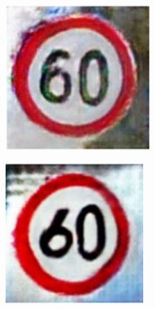 \begin{figure}[H]
\begin{subfigure}{0.125\textwidth}
    \end{subfigure}
    \hspace{2em}%
    \begin{subfigure}{0.125\textwidth}
        \centering
        \includegraphics[height=\textwidth]{../images/Taiwan Schilder/Generated6.png}
    \end{subfigure}
    \hspace{2em}%
    \begin{subfigure}{0.125\textwidth}
        \centering
        \includegraphics[height=\textwidth]{../images/Taiwan Schilder/Generated7.png}

\end{subfigure}
\end{figure}
